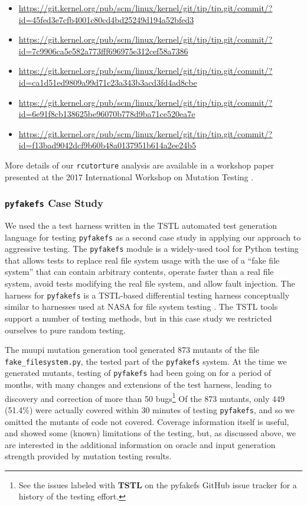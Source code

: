 \documentclass{svjour3}
\begin{document}
\begin{itemize}
\item \url{https://git.kernel.org/pub/scm/linux/kernel/git/tip/tip.git/commit/?id=45fed3e7cfb4001c80cd4bd25249d194a52bfed3}
\item \url{https://git.kernel.org/pub/scm/linux/kernel/git/tip/tip.git/commit/?id=7c9906ca5e582a773fff696975e312cef58a7386}
\item \url{https://git.kernel.org/pub/scm/linux/kernel/git/tip/tip.git/commit/?id=ca1d51ed9809a99d71c23a343b3acd3fd4ad8cbe}
\item \url{https://git.kernel.org/pub/scm/linux/kernel/git/tip/tip.git/commit/?id=6e91f8cb138625be96070b778d9ba71ce520ea7e}
\item \url{https://git.kernel.org/pub/scm/linux/kernel/git/tip/tip.git/commit/?id=f13bad9042dcf9b60b48a0137951b614a2ee24b5}
\end{itemize}

More details of our {\tt rcutorture} analysis are available in a
workshop paper presented at the 2017 International Workshop on
Mutation Testing \cite{mutKernel}.

\subsubsection {{\tt pyfakefs} Case Study}

We used the a test harness written in  the TSTL
\cite{NFM15,ISSTA15,tstlsttt,tstl} automated test generation language for
testing {\tt pyfakefs} \cite{pyfakefs} as a second case study in applying our approach
to aggressive testing.  The {\tt pyfakefs} module is a widely-used
tool for Python testing that allows tests to replace real file system
usage with the use of a ``fake file system'' that can contain
arbitrary contents, operate faster than a real file system, avoid
tests modifying the real file system, and allow fault injection.  The
harness for {\tt pyfakefs} is a TSTL-based differential testing
harness conceptually similar to harnesses used at NASA for file system
testing \cite{ICSEDiff,CFV08}.  The TSTL tools support a number of testing
methods, but in this case study we restricted ourselves to pure random testing.

The muupi \cite{muupi} mutation generation tool generated 873
mutants of the file {\tt fake\_filesystem.py}, the tested part of the
{\tt pyfakefs} system.  At the time we generated mutants, testing of
{\tt pyfakefs} had been going on for a period of months, with many
changes and extensions of the test harness, leading to discovery and
correction of more than 50 bugs\footnote{See the issues labeled with
  {\bf TSTL} on the pyfakefs GitHub issue tracker for a history of the
  testing effort.}  Of the 873 mutants, only 449 (51.4\%) were actually covered
within 30 minutes of testing {\tt pyfakefs}, and so we omitted the
mutants of code not covered.  Coverage information itself is useful,
and showed some (known) limitations of the testing, but, as discussed
above, we are interested in the additional information on oracle and
input generation strength provided by mutation testing results.
\end{document}
